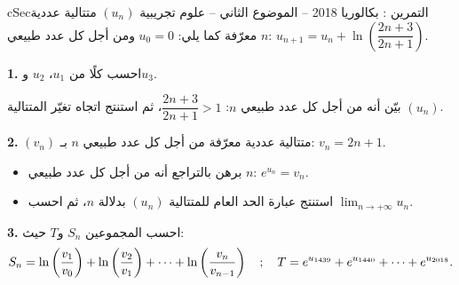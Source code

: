\documentclass[12pt,a4paper]{article}
\newenvironment{BOX}[2]{\begin{otherlanguage}{english}\begin{arbox}{#1}{#2}}{\end{arbox}\end{otherlanguage}}
\newcounter{exo}
\newenvironment{tamrin}[1]{\stepcounter{exo}\begin{BOX}{cSec}{التمرين \theexo: #1}}{\end{BOX}}
\renewcommand{\cdots}{\mathinner{\cdotp\cdotp\cdotp}}
\newcommand{\limn}{\displaystyle\lim_{n\to+\infty}}
\newenvironment{sq}{\begin{itemize}[leftmargin=2.4em,itemsep=3pt]}{\end{itemize}}
\newcommand{\qa}{\item[(أ)]}\newcommand{\qb}{\item[(ب)]}\newcommand{\qc}{\item[(جـ)]}\newcommand{\qd}{\item[(د)]}\newcommand{\qe}{\item[(هـ)]}
\newcommand{\QQ}[1]{\par\smallskip\textbf{#1.} }
\begin{document}
\begin{tamrin}{بكالوريا 2018 -- الموضوع الثاني -- علوم تجريبية}
$(u_n)$ متتالية عددية معرّفة كما يلي: $u_0=0$ ومن أجل كل عدد طبيعي $n$: $u_{n+1}=u_n+\ln\left(\dfrac{2n+3}{2n+1}\right)$.
\QQ{1} احسب كلًا من $u_1$، $u_2$ و$u_3$.

بيّن أنه من أجل كل عدد طبيعي $n$: $\dfrac{2n+3}{2n+1}>1$، ثم استنتج اتجاه تغيّر المتتالية $(u_n)$.
\QQ{2} $(v_n)$ متتالية عددية معرّفة من أجل كل عدد طبيعي $n$ بـ: $v_n=2n+1$.
\begin{sq}
\qa برهن بالتراجع أنه من أجل كل عدد طبيعي $n$: $e^{u_n}=v_n$.
\qb استنتج عبارة الحد العام للمتتالية $(u_n)$ بدلالة $n$، ثم احسب $\limn u_n$.
\end{sq}
\QQ{3} احسب المجموعين $S_n$ و$T$ حيث:
\[S_n=\ln\left(\frac{v_1}{v_0}\right)+\ln\left(\frac{v_2}{v_1}\right)+\cdots+\ln\left(\frac{v_n}{v_{n-1}}\right)\quad;\quad T=e^{u_{1439}}+e^{u_{1440}}+\cdots+e^{u_{2018}}.\]
\end{tamrin}
\end{document}
